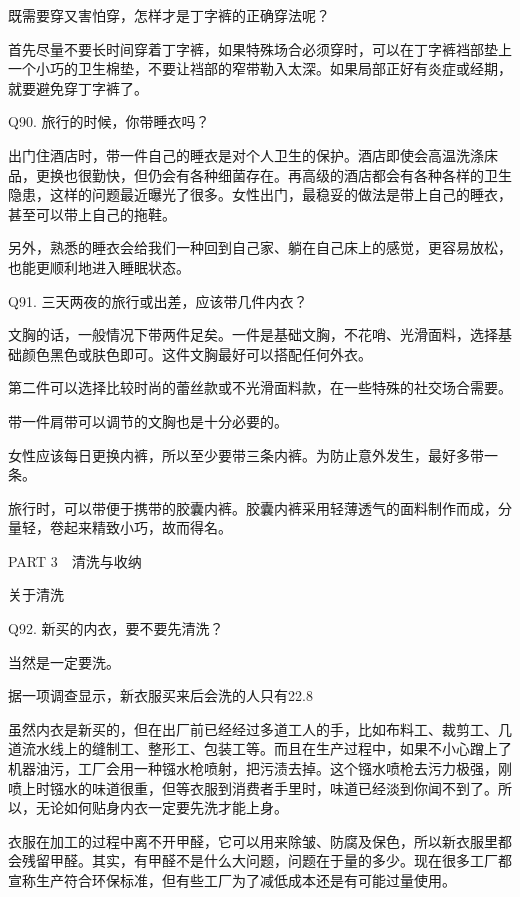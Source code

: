 \documentclass[12pt,UTF8]{ctexbook}
\begin{document}
既需要穿又害怕穿，怎样才是丁字裤的正确穿法呢？

首先尽量不要长时间穿着丁字裤，如果特殊场合必须穿时，可以在丁字裤裆部垫上一个小巧的卫生棉垫，不要让裆部的窄带勒入太深。如果局部正好有炎症或经期，就要避免穿丁字裤了。





Q90. 旅行的时候，你带睡衣吗？


出门住酒店时，带一件自己的睡衣是对个人卫生的保护。酒店即使会高温洗涤床品，更换也很勤快，但仍会有各种细菌存在。再高级的酒店都会有各种各样的卫生隐患，这样的问题最近曝光了很多。女性出门，最稳妥的做法是带上自己的睡衣，甚至可以带上自己的拖鞋。

另外，熟悉的睡衣会给我们一种回到自己家、躺在自己床上的感觉，更容易放松，也能更顺利地进入睡眠状态。



Q91. 三天两夜的旅行或出差，应该带几件内衣？

文胸的话，一般情况下带两件足矣。一件是基础文胸，不花哨、光滑面料，选择基础颜色黑色或肤色即可。这件文胸最好可以搭配任何外衣。

第二件可以选择比较时尚的蕾丝款或不光滑面料款，在一些特殊的社交场合需要。

带一件肩带可以调节的文胸也是十分必要的。


女性应该每日更换内裤，所以至少要带三条内裤。为防止意外发生，最好多带一条。

旅行时，可以带便于携带的胶囊内裤。胶囊内裤采用轻薄透气的面料制作而成，分量轻，卷起来精致小巧，故而得名。





PART 3　清洗与收纳





关于清洗


Q92. 新买的内衣，要不要先清洗？


当然是一定要洗。

据一项调查显示，新衣服买来后会洗的人只有22.8%


虽然内衣是新买的，但在出厂前已经经过多道工人的手，比如布料工、裁剪工、几道流水线上的缝制工、整形工、包装工等。而且在生产过程中，如果不小心蹭上了机器油污，工厂会用一种镪水枪喷射，把污渍去掉。这个镪水喷枪去污力极强，刚喷上时镪水的味道很重，但等衣服到消费者手里时，味道已经淡到你闻不到了。所以，无论如何贴身内衣一定要先洗才能上身。

衣服在加工的过程中离不开甲醛，它可以用来除皱、防腐及保色，所以新衣服里都会残留甲醛。其实，有甲醛不是什么大问题，问题在于量的多少。现在很多工厂都宣称生产符合环保标准，但有些工厂为了减低成本还是有可能过量使用。
\end{document}
